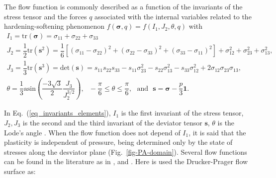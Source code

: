 \documentclass[Journal,letterpaper]{ascelike-new}
\newcommand{\onell}{\boldsymbol{1}}
\newcommand{\sll}{\boldsymbol{s}}
\newcommand{\stress}{\boldsymbol{\sigma}}
\begin{document}

The flow function is commonly described as a function of the invariants of the stress tensor and the forces $q$ associated with the internal variables related to the hardening-softening phenomenon $f(\stress,q) = f(I_1,J_2,\theta,q)$ with
\begin{equation} \label{eq_invariants_elements}
	\begin{array}{lcl}
		I_1 = \text{tr}(\stress) = \sigma_{11}+\sigma_{22}+\sigma_{33}\\
		J_2 = \dfrac{1}{2}\text{tr}(\sll^2) = \dfrac{1}{6}\left[ (\sigma_{11}-\sigma_{22})^2 + (\sigma_{22}-\sigma_{33})^2 + (\sigma_{33}-\sigma_{11})^2 \right] + \sigma_{12}^2+ \sigma_{23}^2+ \sigma_{13}^2, \\
		J_3 = \dfrac{1}{3}\text{tr}(\sll^3) = \text{det}(\sll) = s_{11}s_{22}s_{33}-s_{11}\sigma_{23}^2-s_{22}\sigma_{13}^2-s_{33}\sigma_{12}^2+2\sigma_{12}\sigma_{23}\sigma_{13}, \\ 
		\theta = \dfrac{1}{3}\text{asin}\left( \dfrac{-3\sqrt{3}}{2} \dfrac{J_3}{J_2^{3/2}} \right),~~~
		-\dfrac{\pi}{6} \le \theta \le \dfrac{\pi}{6},~~~\text{and}~~~\sll = \stress - \dfrac{p}{3}\onell.
	\end{array}\;
\end{equation}

In Eq.~(\ref{eq_invariants_elements}), $I_1$ is the first invariant of the stress tensor, $J_2,J_3$ is the second and the third invariant of the deviator tensor $\sll$, $\theta$ is the Lode's angle \cite{chen1988}. When the flow function does not depend of $I_1$, it is said that the plasticity is independent of pressure, being determined only by the state of stresses along the desviator plane (Fig.~\ref{fig-PA-domain}). Several flow functions can be found in the literature as in ,  and . Here is used the Drucker-Prager flow surface as:
\end{document}
